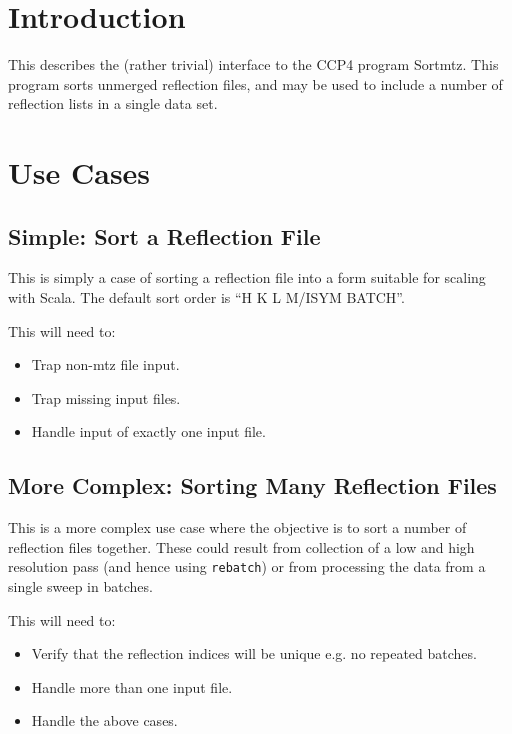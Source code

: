 \documentclass[a4paper, 11pt]{article}
\begin{document}
\section{Introduction}

This describes the (rather trivial) interface to the CCP4 program Sortmtz.
This program sorts unmerged reflection files, and may be used to include 
a number of reflection lists in a single data set.

\section{Use Cases}

\subsection{Simple: Sort a Reflection File}

This is simply a case of sorting a reflection file into a form suitable for
scaling with Scala. The default sort order is ``H K L M/ISYM BATCH''.

This will need to:

\begin{itemize}
\item{Trap non-mtz file input.}
\item{Trap missing input files.}
\item{Handle input of exactly one input file.}
\end{itemize}

\subsection{More Complex: Sorting Many Reflection Files}

This is a more complex use case where the objective is to sort a number
of reflection files together. These could result from collection of a low
and high resolution pass (and hence using \verb|rebatch|) or from processing
the data from a single sweep in batches. 

This will need to:

\begin{itemize}
\item{Verify that the reflection indices will be unique e.g. no repeated 
batches.}
\item{Handle more than one input file.}
\item{Handle the above cases.}
\end{itemize}
\end{document}
